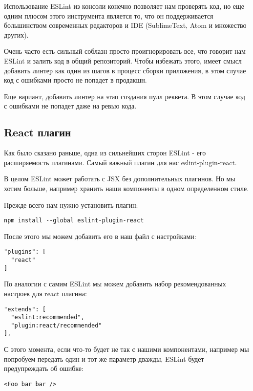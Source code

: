 \documentclass[12pt]{book}
\begin{document}
Использование ESLint из консоли конечно позволяет нам проверять код, но еще одним плюсом этого инструмента является то, что он поддерживается большинством современных редакторов и IDE (SublimeText, Atom и множество других).

Очень часто есть сильный соблазн просто проигнорировать все, что говорит нам ESLint и залить код в общий репозиторий. Чтобы избежать этого, имеет смысл добавить линтер как один из шагов в процесс сборки приложения, в этом случае код с ошибками просто не попадет в продакшн.

Еще вариант, добавить линтер на этап создания пулл реквета. В этом случае код с ошибками не попадет даже на ревью кода.

\subsection*{React плагин}

Как было сказано раньше, одна из сильнейших сторон ESLint - его расширяемость плагинами. Самый важный плагин для нас eslint-plugin-react.

В целом ESLint может работать с JSX без дополнительных плагинов. Но мы хотим больше, например хранить наши компоненты в одном определенном стиле.

Прежде всего нам нужно установить плагин:

\begin{lstlisting}
npm install --global eslint-plugin-react
\end{lstlisting}
   
После этого мы можем добавить его в наш файл с настройками:

\begin{lstlisting}
"plugins": [
  "react"
]
\end{lstlisting}

По аналогии с самим ESLint мы можем добавить набор рекомендованных настроек для react плагина:

\begin{lstlisting}
"extends": [
  "eslint:recommended",
  "plugin:react/recommended"
],
\end{lstlisting}

С этого момента, если что-то будет не так с нашими компонентами, например мы попробуем передать один и тот же параметр дважды, ESLint будет предупреждать об ошибке:

\begin{lstlisting}
<Foo bar bar />
\end{lstlisting}
\end{document}
